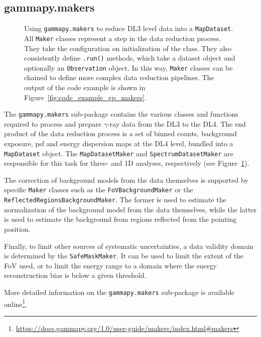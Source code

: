 \documentclass[longauth]{aa}
\newcommand{\code}[1]{\texttt{#1}}
\newcommand{\gammaray}{$\gamma$-ray\xspace}
\begin{document}
\subsection{gammapy.makers}
\label{ssec:gammapy-makers}
%
\begin{figure}
        \small
        \caption{
        Using \code{gammapy.makers} to reduce DL3 level data into a
                \code{MapDataset}. All \code{Maker} classes represent 
                a step in the data reduction process. They take
        the configuration on initialization of the class. They 
                also consistently define \code{.run()} methods, which take
                a dataset object and optionally an \code{Observation} 
                object. In this way, \code{Maker} classes can be chained
                to define more complex data reduction pipelines. The output
                of the code example is shown in Figure~\ref{fig:code_example_gp_makers}.
    }
        \label{fig*:minted:gp_makers}
\end{figure}
%
The \code{gammapy.makers} sub-package contains the various classes and functions required
to process and prepare \gammaray data from the DL3 to the DL4.
The end product of the data reduction process is a set of binned counts,
background exposure, psf and energy dispersion maps at the DL4 level, bundled
into a \code{MapDataset} object.
The \code{MapDatasetMaker} and \code{SpectrumDatasetMaker} are
responsible for this task for three- and 1D analyses, respectively (see Figure~\ref{fig*:minted:gp_makers}).

The correction of background models from the data themselves is supported 
by specific \code{Maker} classes such as the \code{FoVBackgroundMaker} or the
\code{ReflectedRegionsBackgroundMaker}. The former is used to estimate the
normalization of the background model from the data themselves, while the
latter is used to estimate the background from regions reflected from the
pointing position.

Finally, to limit other sources of systematic uncertainties, a data validity
domain is determined by the \code{SafeMaskMaker}. It can be used to limit the
extent of the FoV used, or to limit the energy range to a domain
where the energy reconstruction bias is below a given threshold.

More detailed information on the \code{gammapy.makers} sub-package is available online\footnote{\url{https://docs.gammapy.org/1.0/user-guide/makers/index.html\#makers}}.
\end{document}
